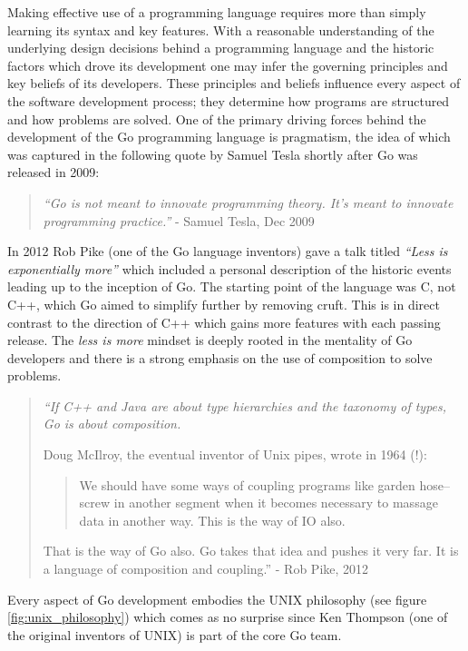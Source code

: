 Making effective use of a programming language requires more than simply learning its syntax and key features. With a reasonable understanding of the underlying design decisions behind a programming language and the historic factors which drove its development one may infer the governing principles and key beliefs of its developers. These principles and beliefs influence every aspect of the software development process; they determine how programs are structured and how problems are solved. One of the primary driving forces behind the development of the Go programming language is pragmatism, the idea of which was captured in the following quote by Samuel Tesla shortly after Go was released in 2009:

\begin{quote}
	\textit{``Go is not meant to innovate programming theory. It's meant to innovate programming practice.''} - Samuel Tesla, Dec 2009 \cite{pragmatic}
\end{quote}

In 2012 Rob Pike (one of the Go language inventors) gave a talk titled \textit{``Less is exponentially more''} which included a personal description of the historic events leading up to the inception of Go. The starting point of the language was C, not C++, which Go aimed to simplify further by removing cruft. This is in direct contrast to the direction of C++ which gains more features with each passing release. The \textit{less is more} mindset is deeply rooted in the mentality of Go developers and there is a strong emphasis on the use of composition to solve problems.

\begin{quote}
	\itshape
	``If C++ and Java are about type hierarchies and the taxonomy of types, Go is about composition.

	Doug McIlroy, the eventual inventor of Unix pipes, wrote in 1964 (!):

	\begin{quote}
		We should have some ways of coupling programs like garden hose--screw in another segment when it becomes necessary to massage data in another way. This is the way of IO also.
	\end{quote}

	That is the way of Go also. Go takes that idea and pushes it very far. It is a language of composition and coupling.''
	\normalfont
	- Rob Pike, 2012 \cite{less_is_more}
\end{quote}

Every aspect of Go development embodies the UNIX philosophy (see figure \ref{fig:unix_philosophy}) which comes as no surprise since Ken Thompson (one of the original inventors of UNIX) is part of the core Go team.

